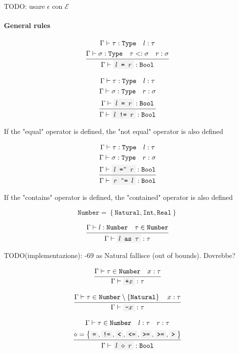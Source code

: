 \documentclass[11pt]{report}
\newcommand{\set}[1]{\left\{#1\right\}}
\newcommand{\infrule}[3][gathered]{\frac{\begin{#1}#2\end{#1}}{\begin{gathered}#3\end{gathered}}}
\newcommand{\then}{\vdash}
\newcommand{\code}[1]{\texttt{\colorbox{gray!10}{#1}}}
\newcommand{\narr}{<:}
\newcommand{\bop}{\diamond}
\newcommand{\expr}{\epsilon}
\newcommand{\Expr}{\mathcal{E}}
\newcommand{\Type}{\texttt{Type}}
\newcommand{\Bool}{\texttt{Bool}}
\newcommand{\Int}{\texttt{Int}}
\newcommand{\Natural}{\texttt{Natural}}
\newcommand{\Real}{\texttt{Real}}
\newcommand{\Env}{\Gamma}
\theoremstyle{definition}
\newcommand{\comment}[1]{
	\parbox{0.9\linewidth}{\color{black!30}\small\sffamily #1}
}
\begin{document}
\newpage

\comment{TODO: usare $\expr$ con $\Expr$}

\paragraph{General rules}

\[
	\infrule{
		\Env\then \tau:\Type \quad l:\tau \\*
		\Env\then \sigma:\Type \quad \tau \narr \sigma \quad r:\sigma
	}{
		\Env\then \code{$l$ = $r$} : \Bool
	}
\]

\[
	\infrule{
		\Env\then \tau:\Type \quad l:\tau \\*
		\Env\then \sigma:\Type \quad r:\sigma \\*
		\Env\then \code{$l$ = $r$} : \Bool
	}{
		\Env\then \code{$l$ != $r$} : \Bool
	}
\]

If the "equal" operator is defined, the "not equal" operator is also defined

\vspace{\baselineskip}

\[
	\infrule{
		\Env\then \tau:\Type \quad l:\tau \\*
		\Env\then \sigma:\Type \quad r:\sigma \\*
		\Env\then \code{$l$ =\~{} $r$}: \Bool
	}{
		\Env\then \code{$r$ \~{}= $l$}: \Bool
	}
\]

If the "contains" operator is defined, the "contained" operator is also defined

\vspace{\baselineskip}

\[
	\texttt{Number} = \set{\Natural, \Int, \Real}
\]

\[
	\infrule{
		\Env\then l:\texttt{Number} \quad \tau \in \texttt{Number}
	}{
		\Env\then \code{$l$ as $\tau$}: \tau
	}
\]

\comment{TODO(implementazione): -69 as Natural fallisce (out of bounds).
Dovrebbe?}

\[
	\infrule{
		\Env\then \tau \in \texttt{Number} \quad x:\tau
	}{
		\Env\then \code{+$x$}: \tau
	}
\]

\[
	\infrule{
		\Env\then \tau \in \texttt{Number}\setminus\set{\Natural} \quad x:\tau
	}{
		\Env\then \code{-$x$}: \tau
	}
\]

\[
	\infrule{
		\Env\then \tau \in \texttt{Number} \quad l:\tau \quad r:\tau\\*
		\bop = \set{\code{=}, \code{!=}, \code{<}, \code{<=}, \code{>=}, \code{>=}, \code{>}}
	}{
		\Env\then \code{$l$ $\bop$ $r$}: \Bool
	}
\]
\end{document}
